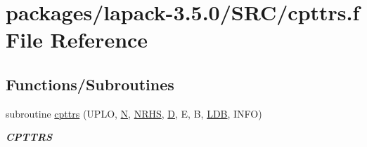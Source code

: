 \hypertarget{cpttrs_8f}{}\section{packages/lapack-\/3.5.0/\+S\+R\+C/cpttrs.f File Reference}
\label{cpttrs_8f}
\subsection*{Functions/\+Subroutines}
\begin{DoxyCompactItemize}
\item 
subroutine \hyperlink{group__complexPTcomputational_ga63605a86c7011a213f3e3f95c98cda5c}{cpttrs} (U\+P\+L\+O, \hyperlink{polmisc_8c_a0240ac851181b84ac374872dc5434ee4}{N}, \hyperlink{example__user_8c_aa0138da002ce2a90360df2f521eb3198}{N\+R\+H\+S}, \hyperlink{odrpack_8h_a7dae6ea403d00f3687f24a874e67d139}{D}, E, B, \hyperlink{example__user_8c_a50e90a7104df172b5a89a06c47fcca04}{L\+D\+B}, I\+N\+F\+O)
\begin{DoxyCompactList}\small\item\em {\bfseries C\+P\+T\+T\+R\+S} \end{DoxyCompactList}\end{DoxyCompactItemize}

